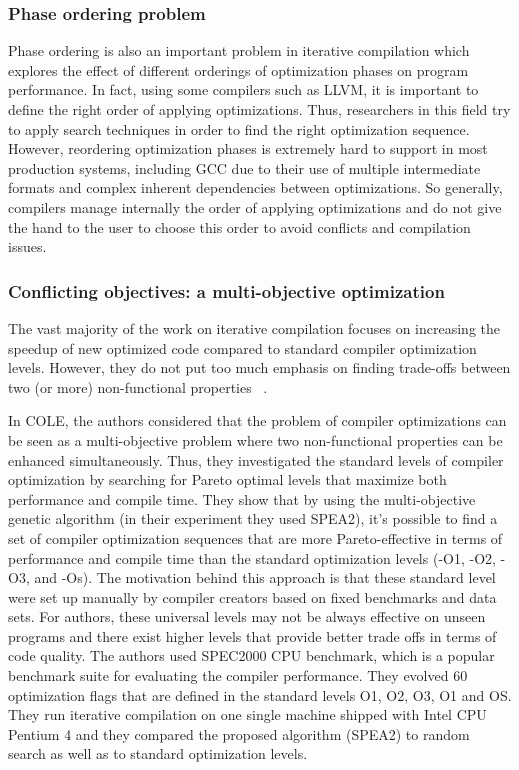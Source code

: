 \subsubsection{Phase ordering problem}
Phase ordering is also an important problem in iterative compilation which explores the effect of different orderings of optimization phases on program performance. In fact, using some compilers such as LLVM, it is important to define the right order of applying optimizations. Thus, researchers in this field try to apply search techniques in order to find the right optimization sequence. However, reordering optimization phases is extremely hard to support in most production systems, including GCC due to their use of multiple intermediate formats and complex inherent dependencies between optimizations. So generally, compilers manage internally the order of applying optimizations and do not give the hand to the user to choose this order to avoid conflicts and compilation issues.


\subsubsection{Conflicting objectives: a multi-objective optimization}
The vast majority of the work on iterative compilation focuses on increasing the speedup of new optimized code compared to standard compiler optimization levels. However, they do not put too much emphasis on finding trade-offs between two (or more) non-functional properties ~\cite{almagor2004finding,hoste2008cole,pan2006fast,pallister2015identifying,chen2012deconstructing,martins2014exploration,lin2008automatic,martinez2014multi}.

In COLE\cite{hoste2008cole}, the authors considered that the problem of compiler optimizations can be seen as a multi-objective problem where two non-functional properties can be enhanced simultaneously. Thus, they investigated the standard levels of compiler optimization by searching for Pareto optimal levels that maximize both performance and compile time. 
They show that by using the multi-objective genetic algorithm (in their experiment they used SPEA2), it’s possible to find a set of compiler optimization sequences that are more Pareto-effective in terms of performance and compile time than the standard optimization levels (-O1, -O2, -O3, and -Os). The motivation behind this approach is that these standard level were set up manually by compiler creators based on fixed benchmarks and data sets. For authors, these universal levels may not be always effective on unseen programs and there exist higher levels that provide better trade offs in terms of code quality.
The authors used SPEC2000 CPU benchmark, which is a popular benchmark suite for evaluating the compiler performance. They evolved 60 optimization flags that are defined in the standard levels O1, O2, O3, O1 and OS. They run iterative compilation on one single machine shipped with Intel CPU Pentium 4 and they compared the proposed algorithm (SPEA2) to random search as well as to standard optimization levels.

